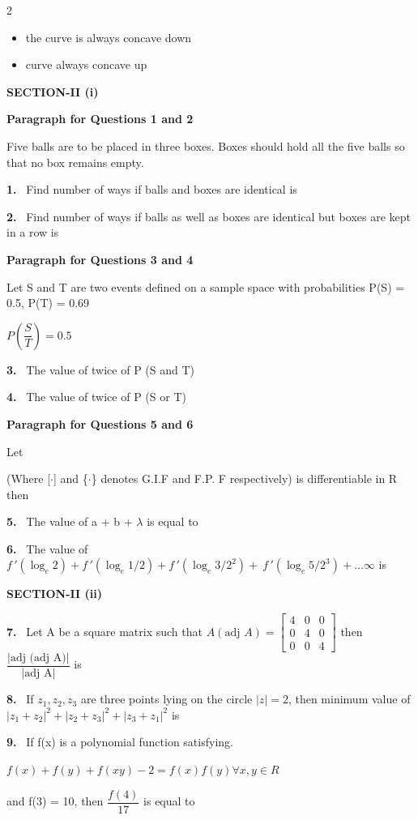 \documentclass[10pt]{extarticle}
\newcommand{\sect}[1]{\par\smallskip\noindent\textbf{#1}\par}
\newcommand{\qn}[1]{\par\smallskip\noindent\textbf{#1.}~}
\newcommand{\paraq}[2]{\par\smallskip\noindent\textbf{Paragraph for Questions #1 and #2}\par}
\newenvironment{qoptions}{\begin{itemize}[leftmargin=1.8em,itemsep=1pt,topsep=2pt,label={}]}{\end{itemize}}
\newcommand{\opt}[2]{\item[(#1)] #2}
\begin{document}
\begin{multicols}{2}
\begin{qoptions}
\opt{C}{the curve is always concave down}
\opt{D}{curve always concave up}
\end{qoptions}
\sect{SECTION-II (i)}
\paraq{1}{2}
Five balls are to be placed in three boxes. Boxes should hold all the five balls so that no box remains empty.
\qn{1} Find number of ways if balls and boxes are identical is
\qn{2} Find number of ways if balls as well as boxes are identical but boxes are kept in a row is
\paraq{3}{4}
Let S and T are two events defined on a sample space with probabilities P(S) = 0.5, P(T) = 0.69\par
$P\left(\dfrac ST\right)=0.5$
\qn{3} The value of twice of P (S and T)
\qn{4} The value of twice of P (S or T)
\paraq{5}{6}
Let \par{}\par
(Where [$\cdot$] and \{$\cdot$\} denotes G.I.F and F.P. F respectively) is differentiable in R then
\qn{5} The value of a + b + $\lambda$ is equal to
\qn{6} The value of $f\,'(\log_e2)+f\,'(\log_e1/2)+f\,'(\log_e3/2^2)+\ f\,'(\log_e5/2^3)+\dots\infty$ is
\sect{SECTION-II (ii)}
\qn{7} Let A be a square matrix such that $A(\text{adj }A)=\begin{bmatrix}4&0&0\\0&4&0\\0&0&4\end{bmatrix}$ then $\dfrac{|\text{adj (adj A)}|}{|\text{adj A}|}$ is
\qn{8} If $z_1,z_2,z_3$ are three points lying on the circle $|z|=2$, then minimum value of $|z_1+z_2|^2+|z_2+z_3|^2+|z_3+z_1|^2$ is
\qn{9} If f(x) is a polynomial function satisfying.\par
$f(x)+f(y)+f(xy)-2=f(x)f(y)\forall x,y\in R$\par
and f(3) = 10, then $\dfrac{f(4)}{17}$ is equal to
\end{multicols}
\end{document}
